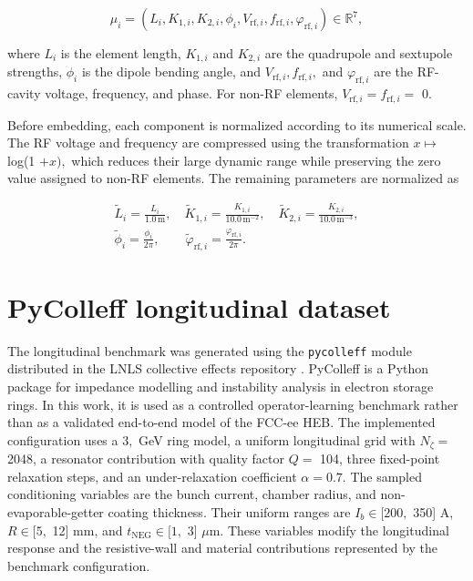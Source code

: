 \begin{equation}
\label{eq:39}
\mu_i=(L_i,K_{1,i},K_{2,i},\phi_i,V_{\mathrm{rf},i},f_{\mathrm{rf},i},\varphi_{\mathrm{rf},i})\in\mathbb R^7,
\end{equation}

where \(L_{i}\) is the element length, \(K_{1 , i}\) and \(K_{2 , i}\) are the quadrupole and sextupole strengths, \(\phi_{i}\) is the dipole bending angle, and \(V_{\mathrm{rf} , i} , f_{\mathrm{rf} , i} ,\) and \(\varphi_{\mathrm{rf} , i}\) are the RF-cavity voltage, frequency, and phase. For non-RF elements, \(V_{\mathrm{rf} , i} = f_{\mathrm{rf} , i} =\) 0.

Before embedding, each component is normalized according to its numerical scale. The RF voltage and frequency are compressed using the transformation \(x \mapsto\) log(1 \(+ x ) ,\) which reduces their large dynamic range while preserving the zero value assigned to non-RF elements. The remaining parameters are normalized as

\begin{equation}
\label{eq:40}
\begin{gathered}\widetilde L_i=\frac{L_i}{1.0\,\mathrm m},\quad\widetilde K_{1,i}=\frac{K_{1,i}}{10.0\,\mathrm m^{-2}},\quad\widetilde K_{2,i}=\frac{K_{2,i}}{10.0\,\mathrm m^{-3}},\\\widetilde\phi_i=\frac{\phi_i}{2\pi},\qquad\widetilde\varphi_{\mathrm{rf},i}=\frac{\varphi_{\mathrm{rf},i}}{2\pi}.\end{gathered}
\end{equation}

\section{PyColleff longitudinal dataset}
\label{sec:03_simulation_workflow_pycolleff_longitudinal_dataset}

The longitudinal benchmark was generated using the \texttt{pycolleff} module distributed in the LNLS collective effects repository \cite{desa2024pycolleff}. PyColleff is a Python package for impedance modelling and instability analysis in electron storage rings. In this work, it is used as a controlled operator-learning benchmark rather than as a validated end-to-end model of the FCC-ee HEB. The implemented configuration uses a \(3 ,\) GeV ring model, a uniform longitudinal grid with \(N_{\zeta} =\) 2048, a resonator contribution with quality factor \(Q =\) 104, three fixed-point relaxation steps, and an under-relaxation coefficient \(\alpha = 0.7 .\) The sampled conditioning variables are the bunch current, chamber radius, and non-evaporable-getter coating thickness. Their uniform ranges are \(I_{b} \in [ 200 ,\) 350] A, \(R \in [ 5 ,\) 12] mm, and \(t_{\mathrm{NEG}} \in [ 1 ,\) 3] \(\mu \mathrm{m} .\) These variables modify the longitudinal response and the resistive-wall and material contributions represented by the benchmark configuration.

